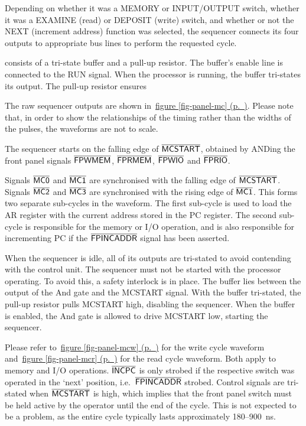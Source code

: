 \documentclass[11pt,a4paper,twocolumns]{article}
\newcommand{\cf}[2][section]{\hyperref[#2]{#1 \ref*{#2} (p.~\pageref*{#2})}}
\newcommand{\fcf}[1]{\cf[figure]{#1}}
\newcommand{\ns}[1]{$\overline{\mbox{\textsf{{#1}}}}$}
\newcommand{\ps}[1]{\textsf{#1}}
\newcommand{\sw}[1]{\textsf{#1}}
\newcommand\register[1]{\textsf{#1}}
\newcommand\MAR{\register{AR}}
\newcommand\PC{\register{PC}}
\begin{document}
Depending on whether it was a \sw{MEMORY} or \sw{INPUT/OUTPUT} switch, whether
it was a \sw{EXAMINE} (read) or \sw{DEPOSIT} (write) switch, and whether or not
the \sw{NEXT} (increment address) function was selected, the sequencer connects
its four outputs to appropriate bus lines to perform the requested cycle. 

consists of a tri-state buffer and
a pull-up resistor. The buffer's enable line is connected to the \ps{RUN}
signal. When the processor is running, the buffer tri-states its output. The
pull-up resistor ensures

The raw sequencer outputs are shown in~\fcf{fig-panel-mc}. Please note that, in
order to show the relationships of the timing rather than the widths of the
pulses, the waveforms are not to scale.

The sequencer starts on the falling edge of \ns{MCSTART}, obtained by ANDing
the front panel signals \ns{FPWMEM}, \ns{FPRMEM}, \ns{FPWIO} and \ns{FPRIO}.

Signals \ns{MC0} and \ns{MC1} are synchronised with the falling edge of
\ns{MCSTART}. Signals \ns{MC2} and \ns{MC3} are synchronised with the rising
edge of \ns{MC1}. This forms two separate sub-cycles in the waveform. The first
sub-cycle is used to load the \MAR{} register with the current address stored
in the \PC{} register. The second sub-cycle is responsible for the memory or
I/O operation, and is also responsible for incrementing \PC{} if the
\ns{FPINCADDR} signal has been asserted.

When the sequencer is idle, all of its outputs are tri-stated to avoid
contending with the control unit. The sequencer must not be started with the
processor operating. To avoid this, a safety interlock is in place. The buffer
lies between the output of the And gate and the \ps{MCSTART} signal. With the
buffer tri-stated, the pull-up resistor pulls \ps{MCSTART} high, disabling the
sequencer. When the buffer is enabled, the And gate is allowed to drive
\ps{MCSTART} low, starting the sequencer.

Please refer to~\fcf{fig-panel-mcw} for the write cycle waveform
and~\fcf{fig-panel-mcr} for the read cycle waveform. Both apply to memory and
I/O operations. \ns{INCPC} is only strobed if the respective switch was
operated in the ‘next’ position, i.e.\ \ns{FPINCADDR} strobed. Control signals
are tri-stated when \ns{MCSTART} is high, which implies that the front panel
switch must be held active by the operator until the end of the cycle. This is
not expected to be a problem, as the entire cycle typically lasts approximately
180–900~ns.
\end{document}
